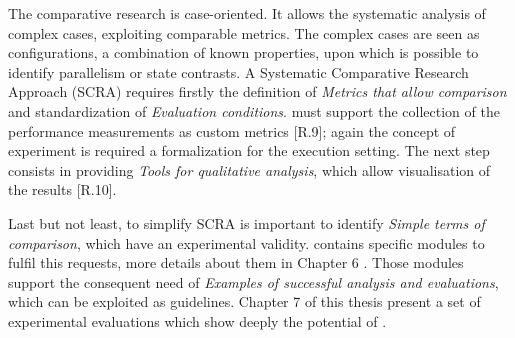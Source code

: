 The comparative research is case-oriented. It allows the systematic analysis of complex cases, exploiting comparable metrics. The complex cases are seen as configurations, a combination of known properties, upon which is possible to identify parallelism or state contrasts. A Systematic Comparative Research Approach (SCRA) requires firstly the definition of \textit{Metrics that allow comparison} and standardization of \textit{Evaluation conditions}.  \name must support the collection of the performance measurements as custom metrics [R.9]; again the concept of experiment is required a formalization for the execution setting. The next step consists in providing \textit{Tools for qualitative analysis}, which allow visualisation of the results [R.10].

Last but not least, to simplify SCRA is important to identify \textit{Simple terms of comparison}, which have an experimental validity. \name contains specific modules to fulfil this requests, more details about them in Chapter 6 . Those modules support the consequent need of \textit{Examples of successful analysis and evaluations}, which can be exploited as guidelines. Chapter 7 of this thesis present a set of experimental evaluations which show deeply the potential of \name.